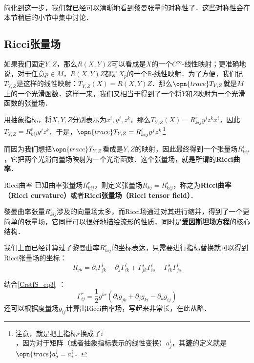 简化到这一步，我们就已经可以清晰地看到黎曼张量的对称性了．这些对称性会在本节稍后的小节中集中讨论．











\subsection{Ricci张量场}

如果我们固定$Y, Z$，那么$R(X, Y)Z$可以看成是$X$的一个$C^{\infty}$-线性映射；更准确地说，对于任意$p\in M$，$R(X, Y)Z$都是$X_p$的一个$\mathbb{R}$-线性映射．为了方便，我们记$T_{Y, Z}$是这样的线性映射：$T_{Y, Z}(X)=R(X, Y)Z$．那么$\opn{trace}T_{Y, Z}$就是$M$上的一个光滑函数．这样一来，我们又相当于得到了一个将$Y$和$Z$映射为一个光滑函数的张量场．

用抽象指标，将$X, Y, Z$分别表示为$x^i, y^j, z^k$，那么$T_{Y, Z}(X)=R^r_{kij}y^jz^kx^i$，因此$T_{Y, Z}=R^r_{kij}y^jz^k$．于是，$\opn{trace}T_{Y, Z}=R^i_{kij}y^jz^k$\footnote{注意，就是把上指标$r$换成了$i$，因为对于矩阵（或者抽象指标表示的线性变换）$a^i_j$，其\textbf{迹}的定义就是$\opn{trace}a^i_j=a^i_i$．}

而因为我们想把$\opn{trace}T_{Y, Z}$看成是$Y, Z$的映射，因此最终得到一个张量场$R^i_{kij}$，它把两个光滑向量场映射为一个光滑函数．这个张量场，就是所谓的\textbf{Ricci曲率}．

\begin{definition}{Ricci曲率}
已知曲率张量场$R^r_{kij}$，则定义张量场$R_{kj}=R^i_{kij}$，称之为\textbf{Ricci曲率（Ricci curvature）}或者\textbf{Ricci张量场（Ricci tensor field）}．
\end{definition}

黎曼曲率张量$R^r_{kij}$涉及的向量场太多，而Ricci场通过对其进行缩并，得到了一个更简单的张量场，它同样可以很好地描绘流形的性质，同时是\textbf{爱因斯坦场方程}的核心结构．

我们上面已经计算过了黎曼曲率$R^r_{kij}$的坐标表达，只需要进行指标替换就可以得到Ricci张量场的坐标：
\begin{equation}
R_{jk}=\partial_i\Gamma^i_{jk}-\partial_j\Gamma^{i}_{ik}+\Gamma^s_{jk}\Gamma^i_{is}-\Gamma^s_{ik}\Gamma^i_{js}
\end{equation}

结合\autoref{CrstfS_eq3}~：
\begin{equation}
\Gamma^{r}_{ij}=\frac{1}{2}g^{kr}(\partial_ig_{jk}+\partial_jg_{ki}-\partial_kg_{ij})
\end{equation}
还可以根据度量场$g_{ij}$计算出Ricci曲率场，写起来非常长，在此从略．






